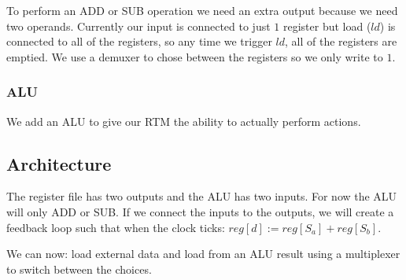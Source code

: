 To perform an ADD or SUB operation we need an extra output because we need two operands.
Currently our input is connected to just \(1\) register but load (\(ld\)) is connected to all of the registers, so any time we trigger \(ld\), all of the registers are emptied.
We use a demuxer to chose between the registers so we only write to \(1\).

\subsubsection{ALU}\label{ssub:alu}

We add an ALU to give our RTM the ability to actually perform actions.

\subsection{Architecture}\label{sub:architecture}

The register file has two outputs and the ALU has two inputs.
For now the ALU will only ADD or SUB.
If we connect the inputs to the outputs, we will create a feedback loop such that when the clock ticks: \(reg[d] := reg[S_a] + reg[S_b]\).

We can now: load external data and load from an ALU result using a multiplexer to switch between the choices.

